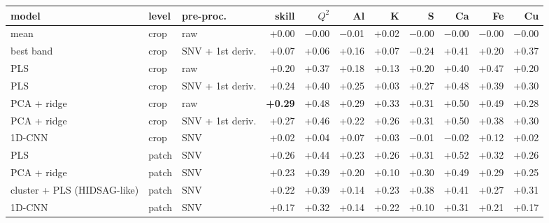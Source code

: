 \begin{tabular}{lllrrrrrrrr}
\toprule
model & level & pre-proc. & skill & $Q^2$ & Al & K & S & Ca & Fe & Cu \\
\midrule
mean & crop & raw & +0.00 & $-$0.00 & $-$0.01 & +0.02 & $-$0.00 & $-$0.00 & $-$0.00 & $-$0.00 \\
best band & crop & SNV + 1st deriv. & +0.07 & +0.06 & +0.16 & +0.07 & $-$0.24 & +0.41 & +0.20 & +0.37 \\
PLS & crop & raw & +0.20 & +0.37 & +0.18 & +0.13 & +0.20 & +0.40 & +0.47 & +0.20 \\
PLS & crop & SNV + 1st deriv. & +0.24 & +0.40 & +0.25 & +0.03 & +0.27 & +0.48 & +0.39 & +0.30 \\
PCA + ridge & crop & raw & \textbf{+0.29} & +0.48 & +0.29 & +0.33 & +0.31 & +0.50 & +0.49 & +0.28 \\
PCA + ridge & crop & SNV + 1st deriv. & +0.27 & +0.46 & +0.22 & +0.26 & +0.31 & +0.50 & +0.38 & +0.30 \\
1D-CNN & crop & SNV & +0.02 & +0.04 & +0.07 & +0.03 & $-$0.01 & $-$0.02 & +0.12 & +0.02 \\
\midrule
PLS & patch & SNV & +0.26 & +0.44 & +0.23 & +0.26 & +0.31 & +0.52 & +0.32 & +0.26 \\
PCA + ridge & patch & SNV & +0.23 & +0.39 & +0.20 & +0.10 & +0.30 & +0.49 & +0.29 & +0.25 \\
cluster + PLS (HIDSAG-like) & patch & SNV & +0.22 & +0.39 & +0.14 & +0.23 & +0.38 & +0.41 & +0.27 & +0.31 \\
1D-CNN & patch & SNV & +0.17 & +0.32 & +0.14 & +0.22 & +0.10 & +0.31 & +0.21 & +0.17 \\
\bottomrule
\end{tabular}

